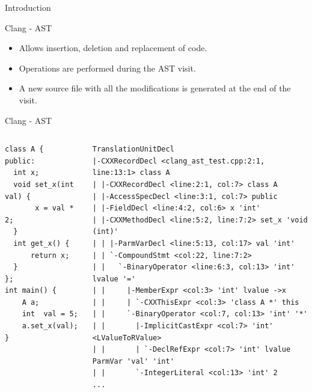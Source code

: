 \documentclass[xcolor=dvipsnames]{beamer}
\begin{document}
\begin{section}{Introduction}
\begin{frame}{\hskip 0.3cm Clang - AST}
\begin{itemize}
\item Allows insertion, deletion and replacement of code.

\item Operations are performed during the AST visit.

\item A new source file with all the modifications is generated at the end of the visit.

\end{itemize}

\end{frame}














\begin{frame}[fragile]{\hskip 0.3cm Clang - AST}

\begin{columns}

\begin{column}{4cm}
\begin{lstlisting}[language=CCC]
class A {
public:
  int x;
  void set_x(int val) {
       x = val * 2;
  }	
  int get_x() {
      return x;
  }
};
int main() {
    A a;
    int  val = 5;
    a.set_x(val);
}
\end{lstlisting}
\end{column}

\begin{column}{7.3cm}

\begin{lstlisting}[language=AST]
TranslationUnitDecl
|-CXXRecordDecl <clang_ast_test.cpp:2:1, line:13:1> class A
| |-CXXRecordDecl <line:2:1, col:7> class A
| |-AccessSpecDecl <line:3:1, col:7> public
| |-FieldDecl <line:4:2, col:6> x 'int'
| |-CXXMethodDecl <line:5:2, line:7:2> set_x 'void (int)'
| | |-ParmVarDecl <line:5:13, col:17> val 'int'
| | `-CompoundStmt <col:22, line:7:2>
| |   `-BinaryOperator <line:6:3, col:13> 'int' lvalue '='
| |     |-MemberExpr <col:3> 'int' lvalue ->x
| |     | `-CXXThisExpr <col:3> 'class A *' this
| |     `-BinaryOperator <col:7, col:13> 'int' '*'
| |       |-ImplicitCastExpr <col:7> 'int' <LValueToRValue>
| |       | `-DeclRefExpr <col:7> 'int' lvalue ParmVar 'val' 'int'
| |       `-IntegerLiteral <col:13> 'int' 2
...
\end{lstlisting}
\end{column}

\end{columns}


\end{frame}








\end{section}
\end{document}

